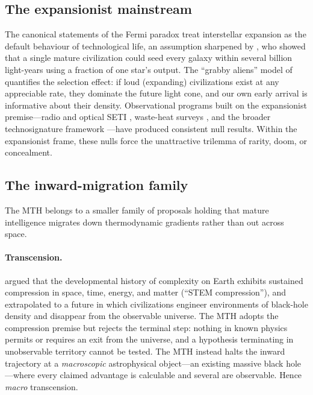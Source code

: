 \documentclass[11pt]{article}
\begin{document}
\subsection{The expansionist mainstream}
The canonical statements of the Fermi paradox \citep{hart1975,tipler1980} treat interstellar expansion as the default behaviour of technological life, an assumption sharpened by \citet{armstrong2013}, who showed that a single mature civilization could seed every galaxy within several billion light-years using a fraction of one star's output. The ``grabby aliens'' model of \citet{hanson2021} quantifies the selection effect: if loud (expanding) civilizations exist at any appreciable rate, they dominate the future light cone, and our own early arrival is informative about their density. Observational programs built on the expansionist premise---radio and optical SETI \citep{tarter2001}, waste-heat surveys \citep{dyson1960,wright2014,griffith2015}, and the broader technosignature framework \citep{wright2022,socas2021,lingam2021}---have produced consistent null results. Within the expansionist frame, these nulls force the unattractive trilemma of rarity, doom, or concealment.

\subsection{The inward-migration family}
The MTH belongs to a smaller family of proposals holding that mature intelligence migrates down thermodynamic gradients rather than out across space.

\paragraph{Transcension.} \citet{smart2012} argued that the developmental history of complexity on Earth exhibits sustained compression in space, time, energy, and matter (``STEM compression''), and extrapolated to a future in which civilizations engineer environments of black-hole density and disappear from the observable universe. The MTH adopts the compression premise but rejects the terminal step: nothing in known physics permits or requires an exit from the universe, and a hypothesis terminating in unobservable territory cannot be tested. The MTH instead halts the inward trajectory at a \emph{macroscopic} astrophysical object---an existing massive black hole---where every claimed advantage is calculable and several are observable. Hence \emph{macro} transcension.
\end{document}
